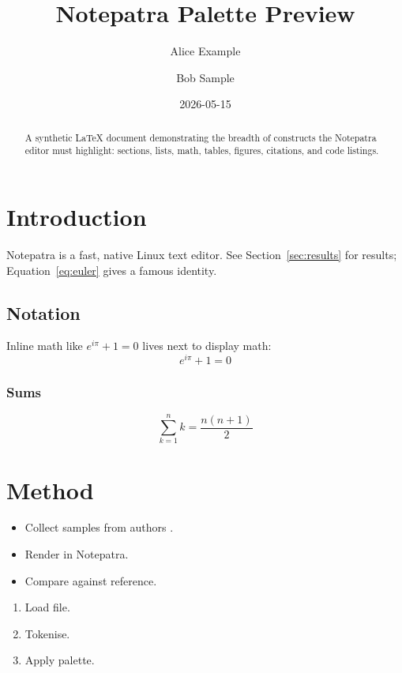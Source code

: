 \documentclass[11pt,a4paper]{article}
\title{Notepatra Palette Preview}
\author{Alice Example \and Bob Sample}
\date{2026-05-15}
\begin{document}
\maketitle

\begin{abstract}
A synthetic LaTeX document demonstrating the breadth of constructs
the Notepatra editor must highlight: sections, lists, math, tables,
figures, citations, and code listings.
\end{abstract}

\tableofcontents

\section{Introduction}\label{sec:intro}
Notepatra is a fast, native Linux text editor. See
Section~\ref{sec:results} for results; Equation~\eqref{eq:euler}
gives a famous identity.

\subsection{Notation}\label{sec:notation}
Inline math like \( e^{i\pi} + 1 = 0 \) lives next to display math:
\begin{equation}\label{eq:euler}
  e^{i\pi} + 1 = 0
\end{equation}

\subsubsection{Sums}
\[
  \sum_{k=1}^{n} k = \frac{n(n+1)}{2}
\]

\section{Method}\label{sec:method}
\begin{itemize}
  \item Collect samples from authors \cite{alice2025demo, bob2026palette}.
  \item Render in Notepatra.
  \item Compare against reference.
\end{itemize}

\begin{enumerate}
  \item Load file.
  \item Tokenise.
  \item Apply palette.
\end{enumerate}
\end{document}
